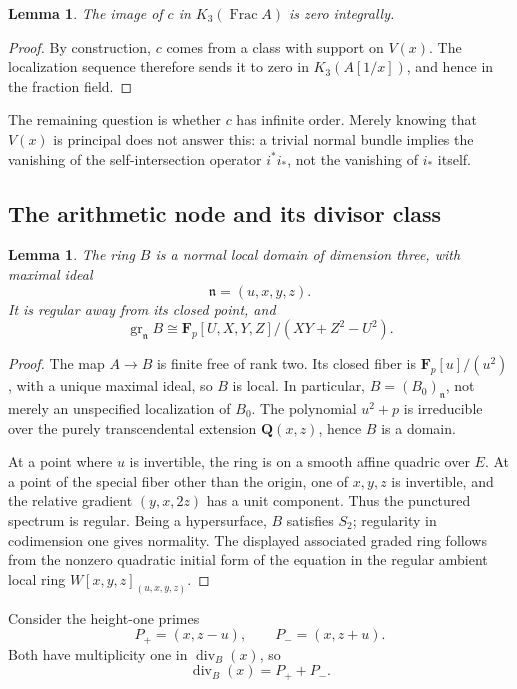 \documentclass[11pt,a4paper]{amsart}
\numberwithin{equation}{section}
\newtheorem{lemma}[theorem]{Lemma}
\theoremstyle{definition}
\theoremstyle{remark}
\newcommand{\Q}{\mathbf Q}
\newcommand{\F}{\mathbf F}
\newcommand{\n}{\mathfrak n}
\newcommand{\Frac}{\operatorname{Frac}}
\newcommand{\divisor}{\operatorname{div}}
\begin{document}
\begin{lemma}\label{d3:lem:genericzero}
The image of $c$ in $K_3(\Frac A)$ is zero integrally.
\end{lemma}
\begin{proof}
By construction, $c$ comes from a class with support on $V(x)$. The localization sequence therefore sends it to zero in $K_3(A[1/x])$, and hence in the fraction field.
\end{proof}

The remaining question is whether $c$ has infinite order. Merely knowing that $V(x)$ is principal does not answer this: a trivial normal bundle implies the vanishing of the self-intersection operator $i^*i_*$, not the vanishing of $i_*$ itself.

\subsection{The arithmetic node and its divisor class}\label{d3:sec:node}

\begin{lemma}\label{d3:lem:normalB}
The ring $B$ is a normal local domain of dimension three, with maximal ideal
\[
\n=(u,x,y,z).
\]
It is regular away from its closed point, and
\[
\operatorname{gr}_{\n}B
\cong\F_p[U,X,Y,Z]/(XY+Z^2-U^2).
\]
\end{lemma}
\begin{proof}
The map $A\to B$ is finite free of rank two. Its closed fiber is $\F_p[u]/(u^2)$, with a unique maximal ideal, so $B$ is local. In particular, $B=(B_0)_{\n}$, not merely an unspecified localization of $B_0$. The polynomial $u^2+p$ is irreducible over the purely transcendental extension $\Q(x,z)$, hence $B$ is a domain.

At a point where $u$ is invertible, the ring is on a smooth affine quadric over $E$. At a point of the special fiber other than the origin, one of $x,y,z$ is invertible, and the relative gradient $(y,x,2z)$ has a unit component. Thus the punctured spectrum is regular. Being a hypersurface, $B$ satisfies $S_2$; regularity in codimension one gives normality. The displayed associated graded ring follows from the nonzero quadratic initial form of the equation in the regular ambient local ring $W[x,y,z]_{(u,x,y,z)}$.
\end{proof}

Consider the height-one primes
\[
P_+=(x,z-u),\qquad P_-=(x,z+u).
\]
Both have multiplicity one in $\divisor_B(x)$, so
\begin{equation}\label{d3:eq:divx}
\divisor_B(x)=P_++P_-.
\end{equation}
\end{document}

